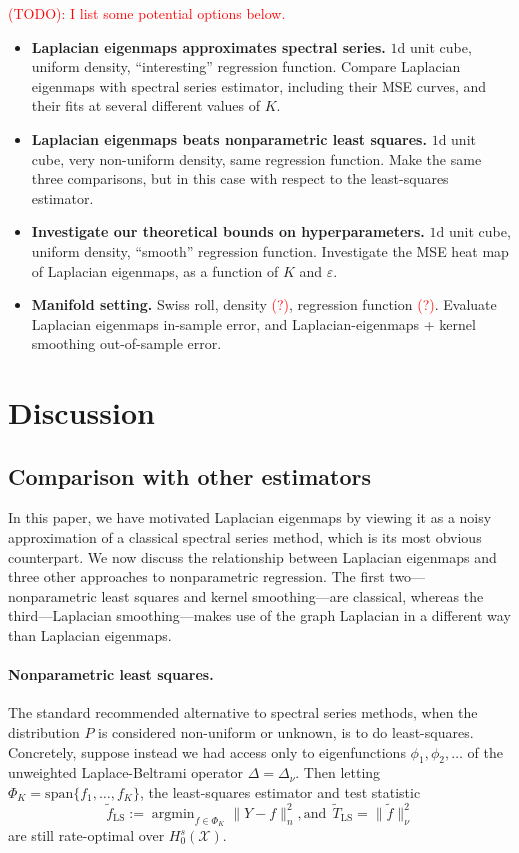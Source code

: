\documentclass{article}
\newcommand{\1}{\mathbf{1}}
\DeclareMathOperator*{\argmin}{argmin}
\newcommand{\mc}[1]{\mathcal{#1}}
\newcommand{\wt}[1]{\widetilde{#1}}
\theoremstyle{alden}
\theoremstyle{aldenthm}
\theoremstyle{definition}
\theoremstyle{remark}
\begin{document}
\textcolor{red}{(TODO): I list some potential options below.}
\begin{itemize}
	\item \textbf{Laplacian eigenmaps approximates spectral series.} $1$d unit cube, uniform density, ``interesting'' regression function. Compare Laplacian eigenmaps with spectral series estimator, including their MSE curves, and their fits at several different values of $K$. 
	\item \textbf{Laplacian eigenmaps beats nonparametric least squares.} $1$d unit cube, very non-uniform density, same regression function. Make the same three comparisons, but in this case with respect to the least-squares estimator.
	\item \textbf{Investigate our theoretical bounds on hyperparameters.} $1$d unit cube, uniform density, ``smooth'' regression function. Investigate the MSE heat map of Laplacian eigenmaps, as a function of $K$ and $\varepsilon$.
	\item \textbf{Manifold setting.} Swiss roll, density \textcolor{red}{(?)}, regression function \textcolor{red}{(?)}. Evaluate Laplacian eigenmaps in-sample error, and Laplacian-eigenmaps + kernel smoothing out-of-sample error.
\end{itemize}

\section{Discussion}
\label{sec:discussion}

\subsection{Comparison with other estimators}
In this paper, we have motivated Laplacian eigenmaps by viewing it as a noisy approximation of a classical spectral series method, which is its most obvious counterpart. We now discuss the relationship between Laplacian eigenmaps and three other approaches to nonparametric regression. The first two---nonparametric least squares and kernel smoothing---are classical, whereas the third---Laplacian smoothing---makes use of the graph Laplacian in a different way than Laplacian eigenmaps.

\paragraph{Nonparametric least squares.}
The standard recommended alternative to spectral series methods, when the distribution $P$ is considered non-uniform or unknown, is to do least-squares. Concretely, suppose instead we had access only to eigenfunctions $\phi_1,\phi_2,\ldots$ of the unweighted Laplace-Beltrami operator $\Delta = \Delta_{\nu}$. Then letting $\Phi_K = \mathrm{span}\{f_1,\ldots,f_K\}$, the least-squares estimator and test statistic
\begin{equation*}
\wt{f}_{\mathrm{LS}} := \argmin_{f \in \Phi_K} \|Y - f\|_n^2,\textrm{and}~~\wt{T}_{\mathrm{LS}} = \|\wt{f}\|_{\nu}^2
\end{equation*}
are still rate-optimal over $H_0^s(\mc{X})$. 
\end{document}
